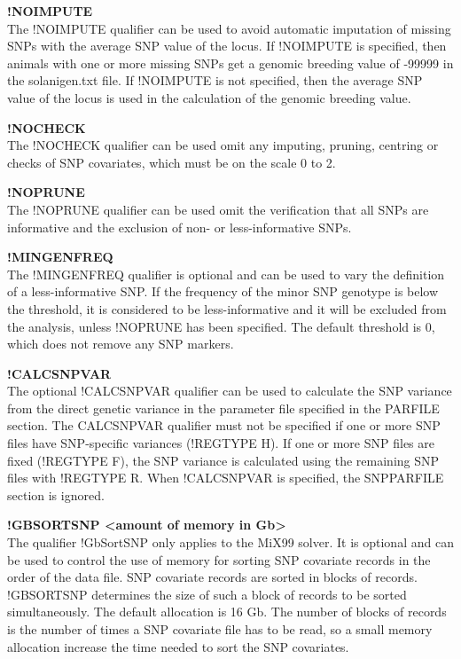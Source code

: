 \textbf{!NOIMPUTE}\\
The !NOIMPUTE qualifier can be used to avoid automatic imputation of
missing SNPs with the average SNP value of the locus. If !NOIMPUTE is
specified, then animals with one or more missing SNPs get a genomic
breeding value of -99999 in the solanigen.txt file. If !NOIMPUTE is not
specified, then the average SNP value of the locus is used in the
calculation of the genomic breeding value.

\textbf{!NOCHECK}\\
The !NOCHECK qualifier can be used omit any imputing, pruning, centring
or checks of SNP covariates, which must be on the scale 0 to 2.

\textbf{!NOPRUNE}\\
The !NOPRUNE qualifier can be used omit the verification that all SNPs
are informative and the exclusion of non- or less-informative SNPs.

\textbf{!MINGENFREQ}\\
The !MINGENFREQ qualifier is optional and can be used to vary the
definition of a less-informative SNP. If the frequency of the minor SNP
genotype is below the threshold, it is considered to be less-informative
and it will be excluded from the analysis, unless !NOPRUNE has been
specified. The default threshold is 0, which does not remove any SNP
markers.

\textbf{!CALCSNPVAR}\\
The optional !CALCSNPVAR qualifier can be used to calculate the SNP
variance from the direct genetic variance in the parameter file
specified in the PARFILE section. The CALCSNPVAR qualifier must not be
specified if one or more SNP files have SNP-specific variances (!REGTYPE
H). If one or more SNP files are fixed (!REGTYPE F), the SNP variance is
calculated using the remaining SNP files with !REGTYPE R. When
!CALCSNPVAR is specified, the SNPPARFILE section is ignored.

\textbf{!GBSORTSNP \textless amount of memory in Gb\textgreater{}}\\
The qualifier !GbSortSNP only applies to the MiX99 solver. It is
optional and can be used to control the use of memory for sorting SNP
covariate records in the order of the data file. SNP covariate records
are sorted in blocks of records. !GBSORTSNP determines the size of such
a block of records to be sorted simultaneously. The default allocation
is 16 Gb. The number of blocks of records is the number of times a SNP
covariate file has to be read, so a small memory allocation increase the
time needed to sort the SNP covariates.

